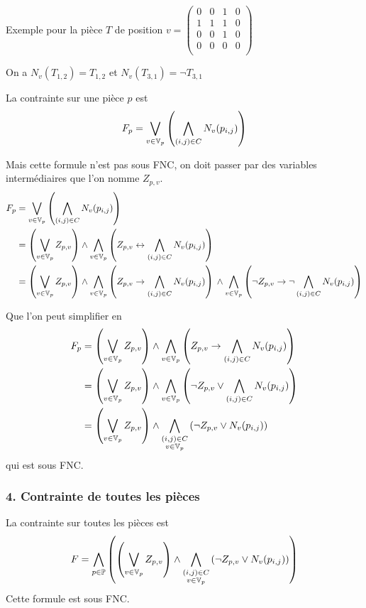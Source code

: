Exemple pour la pièce $T$ de position $v =
    \begin{pmatrix}
        0 & 0 & 1 & 0 \\
        1 & 1 & 1 & 0 \\
        0 & 0 & 1 & 0 \\
        0 & 0 & 0 & 0 \\
    \end{pmatrix}$

On a $N_v(T_{1,2}) = T_{1,2}$ et $N_v(T_{3,1}) = \lnot T_{3,1}$

La contrainte sur une pièce $p$ est
\begin{equation*}
    F_p = \bigvee_{v\in\mathbb{V}_p} \left( \bigwedge_{(i,j)\in C} N_v(p_{i,j}) \right)
\end{equation*}

Mais cette formule n'est pas sous FNC, on doit passer par des variables
intermédiaires que l'on nomme $Z_{p,v}$.
\begin{align*}
    F_p &= \bigvee_{v\in\mathbb{V}_p} \left( \bigwedge_{(i,j)\in C} N_v(p_{i,j}) \right)\\
    &= \left( \bigvee_{v\in\mathbb{V}_p} Z_{p,v} \right)
        \land \bigwedge_{v\in\mathbb{V}_p} \left(Z_{p,v} \leftrightarrow \bigwedge_{(i,j)\in C} N_v(p_{i,j}) \right)\\
    &= \left( \bigvee_{v\in\mathbb{V}_p} Z_{p,v} \right)
        \land \bigwedge_{v\in\mathbb{V}_p} \left(Z_{p,v} \to \bigwedge_{(i,j)\in C} N_v(p_{i,j}) \right){}
        \land \bigwedge_{v\in\mathbb{V}_p} \left(\lnot Z_{p,v} \to \lnot\bigwedge_{(i,j)\in C} N_v(p_{i,j}) \right)\\
\end{align*}

Que l'on peut simplifier en
\begin{align*}
    F_p &= \left( \bigvee_{v\in\mathbb{V}_p} Z_{p,v} \right)
        \land \bigwedge_{v\in\mathbb{V}_p} \left(Z_{p,v} \to \bigwedge_{(i,j)\in C} N_v(p_{i,j}) \right)\\
    &= \left( \bigvee_{v\in\mathbb{V}_p} Z_{p,v} \right)
        \land \bigwedge_{v\in\mathbb{V}_p} \left(\lnot Z_{p,v} \lor \bigwedge_{(i,j)\in C} N_v(p_{i,j}) \right)\\
    &= \left( \bigvee_{v\in\mathbb{V}_p} Z_{p,v} \right)
        \land \bigwedge_{\substack{(i,j)\in C\\v\in\mathbb{V}_p}} \left(\lnot Z_{p,v} \lor N_v(p_{i,j}) \right)\\
\end{align*}
qui est sous FNC.

\subsubsection*{4. Contrainte de toutes les pièces}
La contrainte sur toutes les pièces est
\begin{equation*}
    F = \bigwedge_{p\in\mathbb{P}} \left(\left( \bigvee_{v\in\mathbb{V}_p} Z_{p,v} \right) \land
        \bigwedge_{\substack{(i,j)\in C\\v\in\mathbb{V}_p}} \left(\lnot Z_{p,v} \lor N_v(p_{i,j}) \right)\right)
\end{equation*}
Cette formule est sous FNC.

